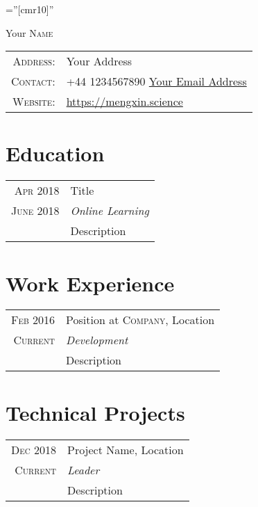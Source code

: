 \documentclass[a4paper,10pt]{article}
\begin{document}
\pagestyle{empty}

\font\fb=''[cmr10]'' %

\par{\centering
        {\Huge Your \textsc{Name}
    }\bigskip\par}


\begin{tabular}{rl}
    \textsc{Address:} & Your Address \\
    \textsc{Contact:} &  +44 1234567890 \qquad   \href{mailto:email}{Your Email Address}\\
    \textsc{Website:} & \url{https://mengxin.science}\\
\end{tabular}

\section{Education}
\begin{longtable}{r|p{14.5cm}}
\textsc{Apr} 2018  & Title\\
\textsc{June} 2018 & \emph{Online Learning}\\
&\footnotesize{Description} 
 \\
\end{longtable}

\section{Work Experience}
\begin{longtable}{r|p{14.5cm}}

\textsc{Feb 2016} & Position at \textsc{Company}, Location\\
\textsc{Current} &\emph{Development}\\
&\footnotesize{Description}
\\

\end{longtable}

\section{Technical Projects}
\begin{longtable}{r|p{14.5cm}}

\textsc{Dec 2018} & Project Name, Location \\
\textsc{Current} &\emph{Leader} \\
&\footnotesize{Description}
\\
\end{longtable}
\end{document}
